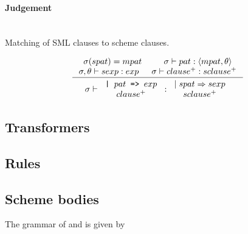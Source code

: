 
\paragraph{Judgement} \\

Matching of SML clauses to scheme clauses.

\[
\inference
{
  \sigma(spat) = mpat &
  \sigma |- pat : \langle mpat, \theta \rangle \\
  \sigma, \theta |- sexp : exp &
  \sigma |- clause^{+} : sclause^{+}
}
{
  \sigma |-
  \begin{tabular}{c}
    \texttt{| $pat$ => $exp$}\\
    $clause^{+}$
  \end{tabular}
  :
  \begin{tabular}{c}
    $\mid spat => sexp$\\
    $sclause^{+}$
  \end{tabular}
}
\]

\clearpage

\subsection{Transformers}

\subsection{Rules}




\subsection{Scheme bodies}

The grammar of  and  is given by




